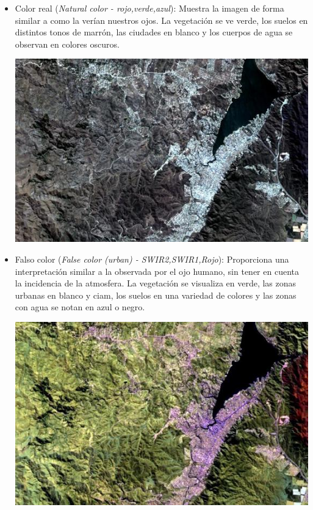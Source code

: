 \documentclass[a4paper,12pt]{book}
\begin{document}
\begin{itemize}
    \item Color real (\emph{Natural color - rojo,verde,azul}): Muestra la imagen de forma similar a como la verían nuestros ojos. La vegetación se ve verde, los suelos en distintos tonos de marrón, las ciudades en blanco y los cuerpos de agua se observan en colores oscuros.
    \begin{center}\includegraphics[scale=0.3]{4-3-2.jpeg}\end{center}
    \item Falso color (\emph{False color (urban) - SWIR2,SWIR1,Rojo}): Proporciona una interpretación similar a la observada por el ojo humano, sin tener en cuenta la incidencia de la atmosfera. La vegetación se visualiza en verde, las zonas urbanas en blanco y ciam, los suelos en una variedad de colores y las zonas con agua se notan en azul o negro.
    \begin{center}\includegraphics[scale=0.3]{12-11-4.jpeg}\end{center}

\end{itemize}
\end{document}
